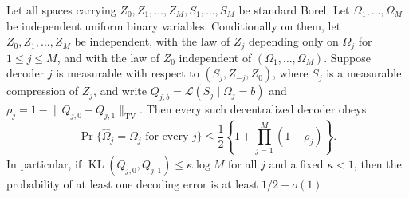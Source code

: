 Let all spaces carrying \(Z_0,Z_1,\ldots,Z_M,S_1,\ldots,S_M\) be standard Borel.  Let \(\Omega_1,\ldots,\Omega_M\) be independent uniform binary variables.  Conditionally on them, let \(Z_0,Z_1,\ldots,Z_M\) be independent, with the law of \(Z_j\) depending only on \(\Omega_j\) for \(1\leq j\leq M\), and with the law of \(Z_0\) independent of \((\Omega_1,\ldots,\Omega_M)\).  Suppose decoder \(j\) is measurable with respect to \((S_j,Z_{-j},Z_0)\), where \(S_j\) is a measurable compression of \(Z_j\), and write \(Q_{j,b}=\mathcal L(S_j\mid\Omega_j=b)\) and \(\rho_j=1-\lVert Q_{j,0}-Q_{j,1}\rVert_{\mathrm{TV}}\).  Then every such decentralized decoder obeys
\[
 \Pr\{\widehat\Omega_j=\Omega_j\text{ for every }j\}
 \leq\frac12\left\{1+\prod_{j=1}^M(1-\rho_j)\right\}.
\]
In particular, if \(\operatorname{KL}(Q_{j,0},Q_{j,1})\leq\kappa\log M\) for all \(j\) and a fixed \(\kappa<1\), then the probability of at least one decoding error is at least \(1/2-o(1)\).